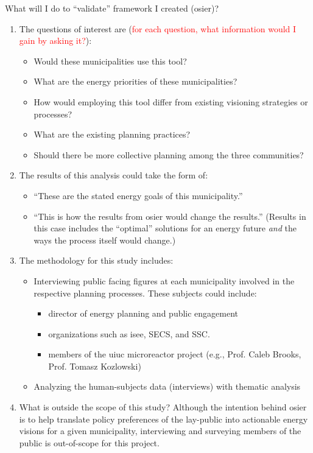 What will I do to ``validate'' framework I created (\ac{osier})?
\begin{enumerate}
    \item The questions of interest are (\textcolor{red}{for each question, what
    information would I gain by asking it?}):
    \begin{itemize}
        \item Would these municipalities use this tool?
        \item What are the energy priorities of these municipalities?
        \item How would employing this tool differ from existing visioning
        strategies or processes?
        \item What are the existing planning practices?
        \item Should there be more collective planning among the three communities?
    \end{itemize}
    \item The results of this analysis could take the form of:
    \begin{itemize}
        \item ``These are the stated energy goals of this municipality.''
        \item ``This is how the results from \ac{osier} would change the
        results.'' (Results in this case includes the ``optimal'' solutions for
        an energy future \textit{and} the ways the process itself would change.)
    \end{itemize}
    \item The methodology for this study includes:
    \begin{itemize}
        \item Interviewing public facing figures at each municipality involved
        in the respective planning processes. These subjects could include:
        \begin{itemize}
            \item director of energy planning and public engagement
            \item organizations such as \ac{isee}, SECS, and SSC. 
            \item members of the \ac{uiuc} microreactor project (e.g., Prof.
            Caleb Brooks, Prof. Tomasz Kozlowski)
        \end{itemize}
        \item Analyzing the human-subjects data (interviews) with thematic
        analysis
    \end{itemize}
    \item What is outside the scope of this study? Although the intention behind
    \ac{osier} is to help translate policy preferences of the lay-public into
    actionable energy visions for a given municipality, interviewing and
    surveying members of the public is out-of-scope for this project.
\end{enumerate}